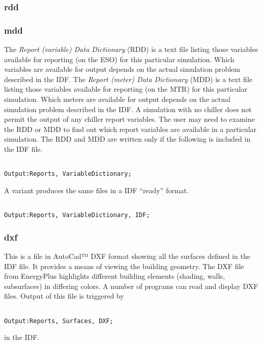 \subsubsection{rdd}\label{rdd}

\subsubsection{mdd}\label{mdd}

The \emph{Report (variable) Data Dictionary} (RDD) is a text file listing those variables available for reporting (on the ESO) for this particular simulation. Which variables are available for output depends on the actual simulation problem described in the IDF. The \emph{Report (meter) Data Dictionary} (MDD) is a text file listing those variables available for reporting (on the MTR) for this particular simulation. Which meters are available for output depends on the actual simulation problem described in the IDF. A simulation with no chiller does not permit the output of any chiller report variables. The user may need to examine the RDD or MDD to find out which report variables are available in a particular simulation. The RDD and MDD are written only if the following is included in the IDF file.

\begin{lstlisting}

Output:Reports, VariableDictionary;
\end{lstlisting}

A variant produces the same files in a IDF ``ready'' format.

\begin{lstlisting}

Output:Reports, VariableDictionary, IDF;
\end{lstlisting}

\subsubsection{dxf}\label{dxf}

This is a file in AutoCad™ DXF format showing all the surfaces defined in the IDF file. It provides a means of viewing the building geometry. The DXF file from EnergyPlus highlights different building elements (shading, walls, subsurfaces) in differing colors. A number of programs can read and display DXF files. Output of this file is triggered by

\begin{lstlisting}

Output:Reports, Surfaces, DXF;
\end{lstlisting}

in the IDF.
